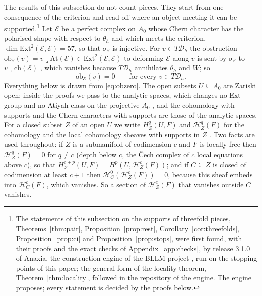\documentclass[11pt,reqno]{amsart}
\numberwithin{equation}{section}
\theoremstyle{plain}
\theoremstyle{definition}
\newcommand{\Ext}{\mathrm{Ext}}
\newcommand{\ch}{\mathrm{ch}}
\newcommand{\cD}{\mathcal{D}}
\begin{document}
The results of this subsection do not count pieces. They start from one consequence of the criterion and read off where an object meeting it can be supported.\footnote{The statements of this subsection on the supports of threefold pieces, Theorems~\ref{thm:pair}, Proposition~\ref{prop:rest}, Corollary~\ref{cor:threefolds}, Proposition~\ref{prop:ci} and Proposition~\ref{prop:stops}, were first found, with their proofs and the exact checks of Appendix~\ref{app:checks}, by release 3.1.0 of Anaxia, the construction engine of the BLLM project \cite{Bha26bllmb}, run on the stopping points of this paper; the general form of the locality theorem, Theorem~\ref{thm:locality}, followed in the repository of the engine. The engine proposes; every statement is decided by the proofs below.} Let $\mathcal{E}$ be a perfect complex on $A_{0}$ whose Chern character has the polarised shape with respect to $\theta_{h}$ and which meets the criterion, $\dim\Ext^{2}(\mathcal{E},\mathcal{E})=57$, so that $\sigma_{\mathcal{E}}$ is injective. For $v\in T\cD_{h}$ the obstruction $\mathrm{ob}_{\mathcal{E}}(v)=v\lrcorner\mathrm{At}(\mathcal{E})\in\Ext^{2}(\mathcal{E},\mathcal{E})$ to deforming $\mathcal{E}$ along $v$ is sent by $\sigma_{\mathcal{E}}$ to $v\lrcorner\ch(\mathcal{E})$ \cite{BF03}, which vanishes because $T\cD_{h}$ annihilates $\theta_{h}$ and $W$; so
\begin{equation}\label{eq:obzero}
\mathrm{ob}_{\mathcal{E}}(v)=0\qquad\text{for every }v\in T\cD_{h}.
\end{equation}
Everything below is drawn from \eqref{eq:obzero}. The open subsets $U\subseteq A_{0}$ are Zariski open; inside the proofs we pass to the analytic spaces, which changes no Ext group and no Atiyah class on the projective $A_{0}$ \cite{Ser56}, and the cohomology with supports and the Chern characters with supports are those of the analytic spaces. For a closed subset $Z$ of an open $U$ we write $H^{q}_{Z}(U,F)$ and $\mathcal{H}^{q}_{Z}(F)$ for the cohomology and the local cohomology sheaves with supports in $Z$ \cite{Har67}. Two facts are used throughout: if $Z$ is a submanifold of codimension $c$ and $F$ is locally free then $\mathcal{H}^{q}_{Z}(F)=0$ for $q\ne c$ (depth below $c$, the \v{C}ech complex of $c$ local equations above $c$), so that $H^{c+p}_{Z}(U,F)=H^{p}(U,\mathcal{H}^{c}_{Z}(F))$; and if $C\subseteq Z$ is closed of codimension at least $c+1$ then $\mathcal{H}^{0}_{C}(\mathcal{H}^{c}_{Z}(F))=0$, because this sheaf embeds into $\mathcal{H}^{c}_{C}(F)$, which vanishes. So a section of $\mathcal{H}^{c}_{Z}(F)$ that vanishes outside $C$ vanishes.
\end{document}
